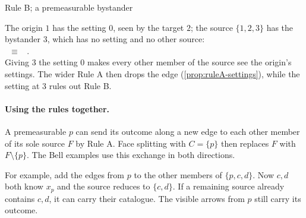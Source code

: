 \begin{validbox}[label=ex:ruleB-bystander]{Rule B; a premeasurable bystander}
\begin{minipage}{0.55\linewidth}
The origin $1$ has the setting $0$, seen by the target $2$; the source $\{1,2,3\}$ has the bystander $3$, which has
no setting and no other source:\\[3pt]
 \ $\equiv$ \ .\\[3pt]
Giving $3$ the setting $0$ makes every other member of the source see the origin's settings. The wider Rule A
then drops the edge (\cref{prop:ruleA-settings}), while the setting at $3$ rules out Rule B.
\end{minipage}\hfill
\begin{minipage}{0.42\linewidth}\centering
{}
\end{minipage}
\end{validbox}

\paragraph{Using the rules together.}\label{sec:compose}
A premeasurable $p$ can send its outcome along a new edge to each other member of its sole source $F$
by Rule A. Face splitting with $C=\{p\}$ then replaces $F$ with $F\setminus\{p\}$.
The Bell examples use this exchange in both directions.

For example, add the edges from $p$ to the other members of $\{p,c,d\}$. Now $c,d$ both know $x_p$
and the source reduces to $\{c,d\}$. If a remaining source already contains $c,d$, it can carry
their catalogue. The visible arrows from $p$ still carry its outcome.

